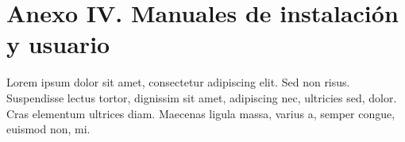 \section*{Anexo IV. Manuales de instalación y usuario}

Lorem ipsum dolor sit amet, consectetur adipiscing elit. Sed non risus. Suspendisse lectus tortor, dignissim sit amet, adipiscing nec, ultricies sed, dolor. Cras elementum ultrices diam. Maecenas ligula massa, varius a, semper congue, euismod non, mi.
